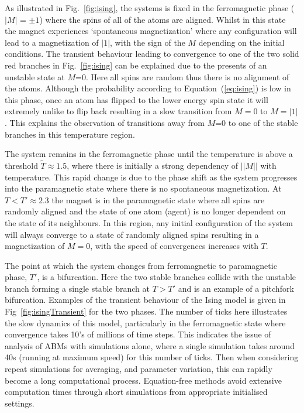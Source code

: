 \documentclass[11pt]{article}
\begin{document}
As illustrated in Fig.~\ref{fig:ising}, the systems is fixed in the ferromagnetic phase ($|M|$ = $\pm 1$) where the spins of all of the atoms are aligned. Whilst in this state the magnet experiences `spontaneous magnetization' where any configuration will lead to a magnetization of $|1|$, with the sign of the $M$ depending on the initial conditions. The transient behaviour leading to convergence to one of the two solid red branches in Fig.~\ref{fig:ising} can be explained due to the presents of an unstable state at $M$=0. Here all spins are random thus there is no alignment of the atoms. Although the probability according to Equation~(\ref{eq:ising}) is low in this phase, once an atom has flipped to the lower energy spin state it will extremely unlike to flip back resulting in a slow transition from $M=0$ to $M=|1|$. This explains the observation of transitions away from $M$=0 to one of the stable branches in this temperature region. 

The system remains in the ferromagnetic phase until the temperature is above a threshold $\widetilde{T}\approx1.5$, where there is initially a strong dependency of $||M||$ with temperature. This rapid change is due to the phase shift as the system progresses into the paramagnetic state where there is no spontaneous magnetization. At $T<T'\approx2.3$ the magnet is in the paramagnetic state where all spins are randomly aligned and the state of one atom (agent) is no longer dependent on the state of its neighbours. In this region, any initial configuration of the system will always converge to a state of randomly aligned spins resulting in a magnetization of $M=0$, with the speed of convergences increases with $T$.

The point at which the system changes from ferromagnetic to paramagnetic phase, $T'$, is a bifurcation. Here the two stable branches collide with the unstable branch forming a single stable branch at $T>T'$ and is an example of a pitchfork bifurcation. Examples of the transient behaviour of the Ising model is given in Fig~\ref{fig:isingTransient} for the two phases. The number of ticks here illustrates the slow dynamics of this model, particularly in the ferromagnetic state where convergence takes 10's of millions of time steps. This indicates the issue of analysis of ABMs with simulations alone, where a single simulation takes around 40s (running at maximum speed) for this number of ticks. Then when considering repeat simulations for averaging, and parameter variation, this can rapidly become a long computational process. Equation-free methods avoid extensive computation times through short simulations from appropriate initialised settings. 
 
\end{document}
